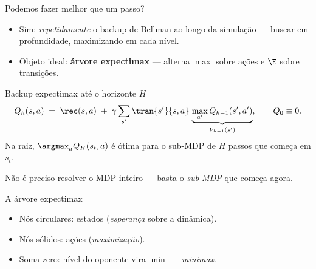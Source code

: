 \documentclass[aspectratio=169, 11pt]{beamer}
\begin{document}
\begin{frame}{Podemos fazer melhor que um passo?}
  \begin{itemize}
    \item Sim: \emph{repetidamente} o backup de Bellman ao longo da simulação --- buscar em profundidade, maximizando em cada nível.
    \item Objeto ideal: \textbf{árvore expectimax} — alterna $\max$ sobre ações e $\E$ sobre transições.
  \end{itemize}

  \pause
  \begin{teobox}{Backup expectimax até o horizonte $H$}
    \[
      Q_h(s,a) \;=\; \rec(s,a) \;+\; \gamma \sum_{s'} \tran{s'}{s,a}\,
      \underbrace{\max_{a'} Q_{h-1}(s',a')}_{V_{h-1}(s')},
      \qquad Q_0 \equiv 0 .
    \]
    Na raiz, $\argmax_a Q_H(s_t,a)$ é ótima para o sub-MDP de $H$ passos que
    começa em $s_t$.
  \end{teobox}

  \pause
  Não é preciso resolver o MDP inteiro --- basta o \emph{sub-MDP} que começa agora.
\end{frame}

\begin{frame}{A árvore expectimax}
  \centering

  \vfill
  \begin{itemize}
    \item Nós circulares: estados (\emph{esperança} sobre a dinâmica).
    \item Nós sólidos: ações (\emph{maximização}).
    \item Soma zero: nível do oponente vira $\min$ — \emph{minimax}.
  \end{itemize}
\end{frame}
\end{document}
